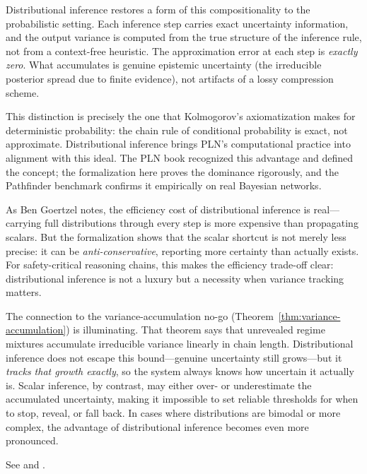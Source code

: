 \documentclass[11pt,openany]{report}
\begin{document}
Distributional inference restores a form of this compositionality to the
probabilistic setting.  Each inference step carries exact uncertainty
information, and the output variance is computed from the true structure of
the inference rule, not from a context-free heuristic.  The approximation
error at each step is \emph{exactly zero}.  What accumulates is genuine
epistemic uncertainty (the irreducible posterior spread due to finite
evidence), not artifacts of a lossy compression scheme.

This distinction is precisely the one that Kolmogorov's axiomatization
makes for deterministic probability: the chain rule of conditional
probability is exact, not approximate.  Distributional inference
brings PLN's computational practice into alignment with this ideal.
The PLN book recognized this advantage and defined the concept; the
formalization here proves the dominance rigorously, and the Pathfinder
benchmark confirms it empirically on real Bayesian networks.

As Ben Goertzel notes, the efficiency cost of distributional inference
is real---carrying full distributions through every step is more expensive
than propagating scalars.  But the formalization shows that the scalar
shortcut is not merely less precise: it can be \emph{anti-conservative},
reporting more certainty than actually exists.  For safety-critical
reasoning chains, this makes the efficiency trade-off clear: distributional
inference is not a luxury but a necessity when variance tracking matters.

\medskip

The connection to the variance-accumulation no-go
(Theorem~\ref{thm:variance-accumulation}) is illuminating.  That theorem
says that unrevealed regime mixtures accumulate irreducible variance
linearly in chain length.  Distributional inference does not escape this
bound---genuine uncertainty still grows---but it \emph{tracks that growth
exactly}, so the system always knows how uncertain it actually is.  Scalar
inference, by contrast, may either over- or underestimate the accumulated
uncertainty, making it impossible to set reliable thresholds for when to
stop, reveal, or fall back.  In cases where distributions are bimodal or
more complex, the advantage of distributional inference becomes even
more pronounced.

\medskip

See 
and .
\end{document}
